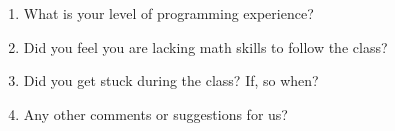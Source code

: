 \documentclass[12pt, a4paper, twoside, titlepage]{article}
\begin{document}
\begin{enumerate}
	\item What is your level of programming experience?
        \begin{figure}[!ht]
             \begin {center}
             \end{center}
        \end{figure}
	\item Did you feel you are lacking math skills to follow the class?
        \begin{figure}[!ht]
             \begin {center}
             \end{center}
        \end{figure}
	\item Did you get stuck during the class? If, so when?
	    \begin{figure}[!ht]
             \begin {center}
             \end{center}
        \end{figure}
	\item Any other comments or suggestions for us?
	    \begin{figure}[!ht]
            \begin {center}
            \end{center}
        \end{figure}
\end{enumerate}
\end{document}

